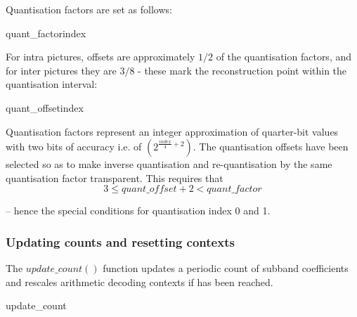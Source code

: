 Quantisation factors are set as follows:

\begin{pseudo}{quant\_factor}{index}
\bsEND
\end{pseudo}

For intra pictures, offsets are approximately $1/2$ of the 
quantisation factors, and for inter pictures they are $3/8$ - these
mark the reconstruction point within the quantisation interval:

\begin{pseudo}{quant\_offset}{index}
\bsELSE
    \bsELSE
    \bsEND
  \bsELSE
  \bsEND
\bsEND
{}
\end{pseudo}

\begin{informative}
Quantisation factors represent an integer approximation of quarter-bit values 
with two bits of accuracy i.e. of $(2^{\frac{index}{4}+2})$.
The quantisation offsets have been selected so as to make inverse quantisation
and re-quantisation by the same quantisation factor transparent. This requires that
\[3\leq quant\_offset+2<quant\_factor\]

-- hence the special conditions for quantisation index 0 and 1.
\end{informative}

\subsubsection{Updating counts and resetting contexts}
\label{updatecounts}

The $update\_count()$ function updates a periodic count of subband 
coefficients and rescales arithmetic decoding contexts if \CoefficientReset has been reached.

\begin{pseudo}{update\_count}{}
\bsIF{\CoefficientCount == \CoefficientReset}
  \bsEND
\bsEND
\end{pseudo}
